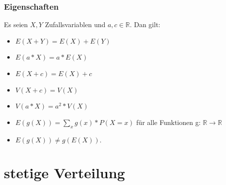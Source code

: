 \documentclass[10pt]{article}
\newtheorem[M]{definition}{Def.}
\newtheorem[M]{satz}{Satz}
\numberwithin{equation}{section}
\newcommand{\RN}{\mathbb{R}} %
\begin{document}
\subsubsection{Eigenschaften}
\begin{satz}
Es seien $X,Y$ Zufallsvariablen und $a,c \in \RN$.
Dan gilt:
\begin{itemize}
	\item $E(X + Y) = E(X) + E(Y)$ 
	\item $E(a * X) = a * E(X)$
	\item $E(X + c) = E(X) + c$ 
	\item $V(X + c) = V(X)$
	\item $V(a * X) = a^2* V(X)$
	\item $E(g(X)) = \sum_{x} g(x) * P(X=x)$ für alle Funktionen g: $\RN \rightarrow \RN$
	\item $E(g(X)) \neq g(E(X))$.
\end{itemize}
\end{satz}

\newpage
\section{stetige Verteilung}
\end{document}
